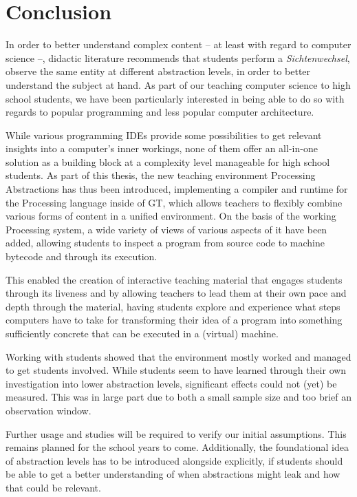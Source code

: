
\chapter{Conclusion} \label{ch_conclusion}

In order to better understand complex content -- at least with regard to computer science --, didactic literature recommends that students perform a \emph{Sichtenwechsel}, \ie observe the same entity at different abstraction levels, in order to better understand the subject at hand. As part of our teaching computer science to high school students, we have been particularly interested in being able to do so with regards to popular programming and less popular computer architecture.

While various programming \acp{IDE} provide some possibilities to get relevant insights into a computer's inner workings, none of them offer an all-in-one solution as a building block at a complexity level manageable for high school students. As part of this thesis, the new teaching environment Processing Abstractions has thus been introduced, implementing a compiler and runtime for the Processing language inside of \acf{GT}, which allows teachers to flexibly combine various forms of content in a unified environment. On the basis of the working Processing system, a wide variety of views of various aspects of it have been added, allowing students to inspect a program from source code to machine bytecode and through its execution.

This enabled the creation of interactive teaching material that engages students through its liveness and by allowing teachers to lead them at their own pace and depth through the material, having students explore and experience what steps computers have to take for transforming their idea of a program into something sufficiently concrete that can be executed in a (virtual) machine.

Working with students showed that the environment mostly worked and managed to get students involved. While students seem to have learned through their own investigation into lower abstraction levels, significant effects could not (yet) be measured. This was in large part due to both a small sample size and too brief an observation window.

Further usage and studies will be required to verify our initial assumptions. This remains planned for the school years to come. Additionally, the foundational idea of abstraction levels has to be introduced alongside explicitly, if students should be able to get a better understanding of when abstractions might leak and how that could be relevant.



